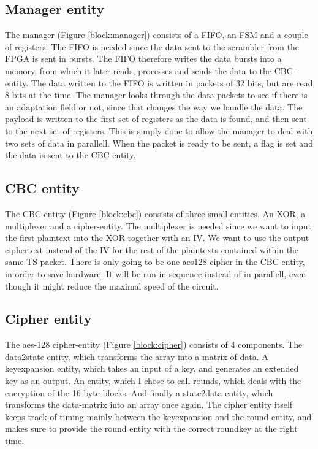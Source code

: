\subsection{Manager entity}
The manager (Figure \ref{block:manager}) consists of a FIFO, an FSM and 
a couple of registers. The FIFO is needed since the data sent to the 
scrambler from the FPGA is sent in bursts. The FIFO therefore writes 
the data bursts into a memory, from which it later reads, processes and 
sends the data to the CBC-entity. The data written to the FIFO is 
written in packets of 32 bits, but are read 8 bits at the time. The 
manager looks through the data packets to see if there is an adaptation 
field or not, since that changes the way we handle the data. The 
payload is written to the first set of registers as the data is found, 
and then sent to the next set of registers. This is simply done to 
allow the manager to deal with two sets of data in parallell. When the 
packet is ready to be sent, a flag is set and the data is sent to the 
CBC-entity. 

\subsection{CBC entity}
The CBC-entity (Figure \ref{block:cbc}) consists of three small 
entities. An XOR, a multiplexer and a cipher-entity. The multiplexer is 
needed since we want to input the first plaintext into the XOR together 
with an IV. We want to use the output ciphertext instead of the IV for 
the rest of the plaintexts contained within the same TS-packet. There 
is only going to be one aes128 cipher in the CBC-entity, in order to 
save hardware. It will be run in sequence instead of in parallell, even 
though it might reduce the maximal speed of the circuit.

\subsection{Cipher entity}
The aes-128 cipher-entity (Figure \ref{block:cipher}) consists of 4 
components. The data2state entity, which transforms the array into a 
matrix of data. A keyexpansion entity, which takes an input of a key, 
and generates an extended key as an output. An entity, which I chose to 
call rounds, which deals with the encryption of the 16 byte blocks. And 
finally a state2data entity, which transforms the data-matrix into an 
array once again. The cipher entity itself keeps track of timing mainly 
between the keyexpansion and the round entity, and makes sure to 
provide the round entity with the correct roundkey at the right time.

